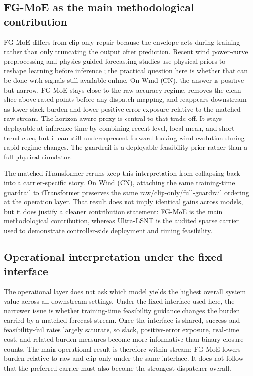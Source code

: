 \documentclass[review,1p,times]{elsarticle}
\begin{document}
\subsection{FG-MoE as the main methodological contribution}

FG-MoE differs from clip-only repair because the envelope acts during training rather than only truncating the output after prediction. Recent wind power-curve preprocessing and physics-guided forecasting studies use physical priors to reshape learning before inference \citep{martincalzada2025optimized,liu2024physics,parsa2025physics}; the practical question here is whether that can be done with signals still available online. On Wind (CN), the answer is positive but narrow. FG-MoE stays close to the raw accuracy regime, removes the clean-slice above-rated points before any dispatch mapping, and reappears downstream as lower slack burden and lower positive-error exposure relative to the matched raw stream. The horizon-aware proxy is central to that trade-off. It stays deployable at inference time by combining recent level, local mean, and short-trend cues, but it can still underrepresent forward-looking wind evolution during rapid regime changes. The guardrail is a deployable feasibility prior rather than a full physical simulator.

The matched iTransformer reruns keep this interpretation from collapsing back into a carrier-specific story. On Wind (CN), attaching the same training-time guardrail to iTransformer preserves the same raw/clip-only/full-guardrail ordering at the operation layer. That result does not imply identical gains across models, but it does justify a cleaner contribution statement: FG-MoE is the main methodological contribution, whereas Ultra-LSNT is the audited sparse carrier used to demonstrate controller-side deployment and timing feasibility.

\subsection{Operational interpretation under the fixed interface}
\label{subsec:disc_dispatch_network}
\label{subsec:disc_dispatch}

The operational layer does not ask which model yields the highest overall system value across all downstream settings. Under the fixed interface used here, the narrower issue is whether training-time feasibility guidance changes the burden carried by a matched forecast stream. Once the interface is shared, success and feasibility-fail rates largely saturate, so slack, positive-error exposure, real-time cost, and related burden measures become more informative than binary closure counts. The main operational result is therefore within-stream: FG-MoE lowers burden relative to raw and clip-only under the same interface. It does not follow that the preferred carrier must also become the strongest dispatcher overall.
\end{document}
